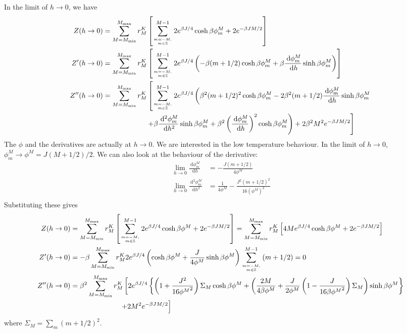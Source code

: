 \documentclass{revtex4-2}
\begin{document}
In the limit of \(h \to 0\), we  have
\begin{align}
	     Z(h \to 0) &=\sum_{M=M_\text{min}}^{M_\text{max}}r^K_M\left[\sum_{m=-M, \atop{m\in \mathbb{Z}}}^{M-1}2e^{\beta J/4}\cosh \beta\phi^M_m + 2e^{-\beta JM/2}\right]\\
	Z^\prime(h \to 0) &=\sum_{M=M_\text{min}}^{M_\text{max}}r^K_M\left[\sum_{m=-M, \atop{m\in \mathbb{Z}}}^{M-1}2e^{\beta J/4}\left(-\beta (m+1/2) \cosh \beta\phi^M_m + \beta\frac{\:\mathrm{d}\phi^M_m}{\:\mathrm{d}h}\sinh \beta\phi^M_m\right)\right]\\
	Z^{\prime\prime}(h \to 0) &=\sum_{M=M_\text{min}}^{M_\text{max}}r^K_M\left[\sum_{m=-M, \atop{m\in \mathbb{Z}}}^{M-1}2 e^{\beta J/4}\left(\beta^2 (m+1/2)^2 \cosh \beta\phi^M_m - 2\beta^2 (m+1/2)\frac{\:\mathrm{d}\phi^M_m}{\:\mathrm{d}h}\sinh \beta\phi^M_m\right.\right.\\
			    &\quad\quad\quad\quad\quad\quad\left.\left. + \beta\frac{\:\mathrm{d^2}\phi^M_m}{\:\mathrm{d}h^2}\sinh \beta\phi^M_m + \beta^2\left(\frac{\:\mathrm{d}\phi^M_m}{\:\mathrm{d}h}\right)^2 \cosh \beta\phi^M_m\right) + 2\beta^2 M^2 e^{-\beta JM/2}\right]\\
\end{align}
The \(\phi\) and the derivatives are actually at \(h\to 0\). We are interested in the low temperature behaviour. In the limit of \(h \to 0\), \(\phi_m^M \to \phi^M = J(M+1/2)/2\). We can also look at the behaviour of the derivative:
\begin{align}
	\lim_{h \to 0}\frac{\:\mathrm{d}\phi_m^M}{\:\mathrm{d}h} &= -\frac{J(m+1/2)}{4\phi^M}\\
	\lim_{h \to 0}\frac{\:\mathrm{d}^2\phi_m^M}{\:\mathrm{d}h^2} &= \frac{1}{4\phi^M} - \frac{J^2(m + 1/2)^2}{16\left(\phi^M\right)^3}\\
\end{align}
Substituting these gives
\begin{align}
	     Z(h \to 0) &=\sum_{M=M_\text{min}}^{M_\text{max}}r^K_M\left[\sum_{m=-M, \atop{m\in \mathbb{Z}}}^{M-1}2e^{\beta J/4}\cosh \beta\phi^M + 2e^{-\beta JM/2}\right] = \sum_{M=M_\text{min}}^{M_\text{max}}r^K_M\left[4Me^{\beta J/4}\cosh \beta\phi^M + 2e^{-\beta JM/2}\right]\\
	Z^\prime(h \to 0) &=-\beta\sum_{M=M_\text{min}}^{M_\text{max}}r^K_M2e^{\beta J/4} \left(\cosh \beta\phi^M + \frac{J}{4\phi^M}\sinh \beta\phi^M\right)\sum_{m=-M, \atop{m\in \mathbb{Z}}}^{M-1}\left( m + 1/2 \right) = 0\\
Z^{\prime\prime}(h \to 0) &=\beta^2\sum_{M=M_\text{min}}^{M_\text{max}}r^K_M\left[2 e^{\beta J/4}\left\{\left(1 + \frac{J^2}{16{\phi^M}^2}\right) \Sigma_M \cosh \beta\phi^M + \left(\frac{2M}{4\beta\phi^M} + \frac{J}{2\phi^M}\left(1 - \frac{J}{16\beta{\phi^M}^2}\right)\Sigma_M \right) \sinh \beta\phi^M\right\} \right.\\
			  &\quad\quad\quad\quad\quad\quad\quad\left.+ 2 M^2 e^{-\beta JM/2}\right]\\
\end{align}
where \(\Sigma_M = \sum_m (m+1/2)^2\).
\end{document}
